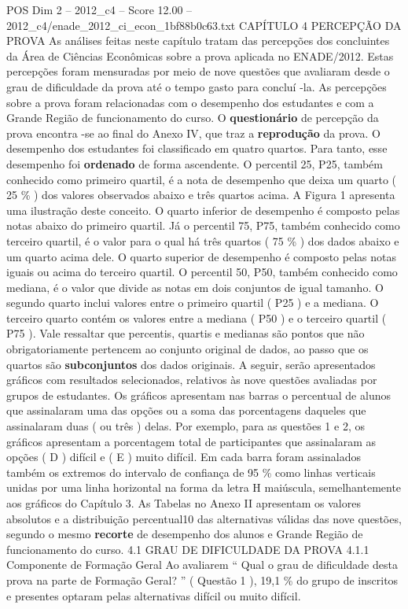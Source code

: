 \begin{textsample}{POS Dim 2 – 2012\_c4 – Score 12.00 – 2012\_c4/enade\_2012\_ci\_econ\_1bf88b0c63.txt}  \label{ex:f2_pos_103}
CAPÍTULO 4 PERCEPÇÃO DA PROVA As análises feitas neste capítulo tratam das percepções dos concluintes da Área de Ciências Econômicas sobre a prova aplicada no ENADE/2012.
Estas percepções foram mensuradas por meio de nove questões que avaliaram desde o grau de dificuldade da prova até o tempo gasto para concluí -la.
As percepções sobre a prova foram relacionadas com o desempenho dos estudantes e com a Grande Região de funcionamento do curso.
O \textbf{questionário} de percepção da prova encontra -se ao final do Anexo IV, que traz a \textbf{reprodução} da prova.
O desempenho dos estudantes foi classificado em quatro quartos.
Para tanto, esse desempenho foi \textbf{ordenado} de forma ascendente.
O percentil 25, P25, também conhecido como primeiro quartil, é a nota de desempenho que deixa um quarto ( 25 \% ) dos valores observados abaixo e três quartos acima.
A Figura 1 apresenta uma ilustração deste conceito.
O quarto inferior de desempenho é composto pelas notas abaixo do primeiro quartil.
Já o percentil 75, P75, também conhecido como terceiro quartil, é o valor para o qual há três quartos ( 75 \% ) dos dados abaixo e um quarto acima dele.
O quarto superior de desempenho é composto pelas notas iguais ou acima do terceiro quartil.
O percentil 50, P50, também conhecido como mediana, é o valor que divide as notas em dois conjuntos de igual tamanho.
O segundo quarto inclui valores entre o primeiro quartil ( P25 ) e a mediana.
O terceiro quarto contém os valores entre a mediana ( P50 ) e o terceiro quartil ( P75 ).
Vale ressaltar que percentis, quartis e medianas são pontos que não obrigatoriamente pertencem ao conjunto original de dados, ao passo que os quartos são \textbf{subconjuntos} dos dados originais.
A seguir, serão apresentados gráficos com resultados selecionados, relativos às nove questões avaliadas por grupos de estudantes.
Os gráficos apresentam nas barras o percentual de alunos que assinalaram uma das opções ou a soma das porcentagens daqueles que assinalaram duas ( ou três ) delas.
Por exemplo, para as questões 1 e 2, os gráficos apresentam a porcentagem total de participantes que assinalaram as opções ( D ) difícil e ( E ) muito difícil.
Em cada barra foram assinalados também os extremos do intervalo de confiança de 95 \% como linhas verticais unidas por uma linha horizontal na forma da letra H maiúscula, semelhantemente aos gráficos do Capítulo 3.
As Tabelas no Anexo II apresentam os valores absolutos e a distribuição percentual10 das alternativas válidas das nove questões, segundo o mesmo \textbf{recorte} de desempenho dos alunos e Grande Região de funcionamento do curso. 4.1 GRAU DE DIFICULDADE DA PROVA 4.1.1 Componente de Formação Geral Ao avaliarem “ Qual o grau de dificuldade desta prova na parte de Formação Geral? ” ( Questão 1 ), 19,1 \% do grupo de inscritos e presentes optaram pelas alternativas difícil ou muito difícil.

\end{textsample}
